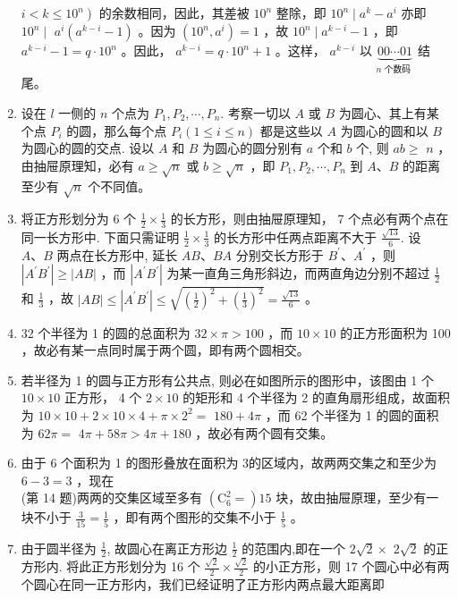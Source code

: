 \documentclass[10pt]{article}
\begin{document}
\begin{enumerate}
$\left.i<k \leqslant 10^{n}\right)$ 的余数相同，因此，其差被 $10^{n}$ 整除，即 $10^{n} \mid a^{k}-a^{i}$ 亦即 $10^{n} \mid$ $a^{i}\left(a^{k-i}-1\right)$ 。因为 $\left(10^{n}, a^{i}\right)=1$ ，故 $10^{n} \mid a^{k-i}-1$ ，即 $a^{k-i}-1=q \cdot 10^{n}$ 。因此， $a^{k-i}=q \cdot 10^{n}+1$ 。这样， $a^{k-i}$ 以 $\underbrace{00 \cdots 01}_{n \text { 个数码 }}$ 结尾。
  \item 设在 $l$ 一侧的 $n$ 个点为 $P_{1}, P_{2}, \cdots, P_{n}$. 考察一切以 $A$ 或 $B$ 为圆心、其上有某个点 $P_{i}$ 的圆，那么每个点 $P_{i}(1 \leqslant i \leqslant n)$ 都是这些以 $A$ 为圆心的圆和以 $B$ 为圆心的圆的交点. 设以 $A$ 和 $B$ 为圆心的圆分别有 $a$ 个和 $b$ 个, 则 $a b \geqslant$ $n$ ，由抽屉原理知，必有 $a \geqslant \sqrt{n}$ 或 $b \geqslant \sqrt{n}$ ，即 $P_{1}, P_{2}, \cdots, P_{n}$ 到 $A 、 B$ 的距离至少有 $\sqrt{n}$ 个不同值。
  \item 将正方形划分为 6 个 $\frac{1}{2} \times \frac{1}{3}$ 的长方形，则由抽屉原理知， 7 个点必有两个点在同一长方形中. 下面只需证明 $\frac{1}{2} \times \frac{1}{3}$ 的长方形中任两点距离不大于 $\frac{\sqrt{13}}{6}$. 设 $A 、 B$ 两点在长方形中, 延长 $A B 、 B A$ 分别交长方形于 $B^{\prime} 、 A^{\prime}$ ，则 $\left|A^{\prime} B^{\prime}\right| \geqslant|A B|$ ，而 $\left|A^{\prime} B^{\prime}\right|$ 为某一直角三角形斜边，而两直角边分别不超过 $\frac{1}{2}$ 和 $\frac{1}{3}$ ，故 $|A B| \leqslant\left|A^{\prime} B^{\prime}\right| \leqslant \sqrt{\left(\frac{1}{2}\right)^{2}+\left(\frac{1}{3}\right)^{2}}=\frac{\sqrt{13}}{6}$ 。
  \item 32 个半径为 1 的圆的总面积为 $32 \times \pi>100$ ，而 $10 \times 10$ 的正方形面积为 100 ，故必有某一点同时属于两个圆，即有两个圆相交。
  \item 若半径为 1 的圆与正方形有公共点, 则必在如图所示的图形中，该图由 1 个 $10 \times 10$ 正方形， 4 个 $2 \times 10$ 的矩形和 4 个半径为 2 的直角扇形组成，故面积为 $10 \times 10+2 \times 10 \times 4+\pi \times 2^{2}=$ $180+4 \pi$ ，而 62 个半径为 1 的圆的面积为 $62 \pi=$ $4 \pi+58 \pi>4 \pi+180$ ，故必有两个圆有交集。
  \item 由于 6 个面积为 1 的图形叠放在面积为 3的区域内，故两两交集之和至少为 $6-3=3$ ，现在\\
(第 14 题)两两的交集区域至多有 $\left(\mathrm{C}_{6}^{2}=\right) 15$ 块，故由抽屉原理，至少有一块不小于 $\frac{3}{15}=\frac{1}{5}$ ，即有两个图形的交集不小于 $\frac{1}{5}$ 。
  \item 由于圆半径为 $\frac{1}{2}$, 故圆心在离正方形边 $\frac{1}{2}$ 的范围内,即在一个 $2 \sqrt{2} \times$ $2 \sqrt{2}$ 的正方形内. 将此正方形划分为 16 个 $\frac{\sqrt{2}}{2} \times \frac{\sqrt{2}}{2}$ 的小正方形，则 17 个圆心中必有两个圆心在同一正方形内，我们已经证明了正方形内两点最大距离即
\end{enumerate}
\end{document}
